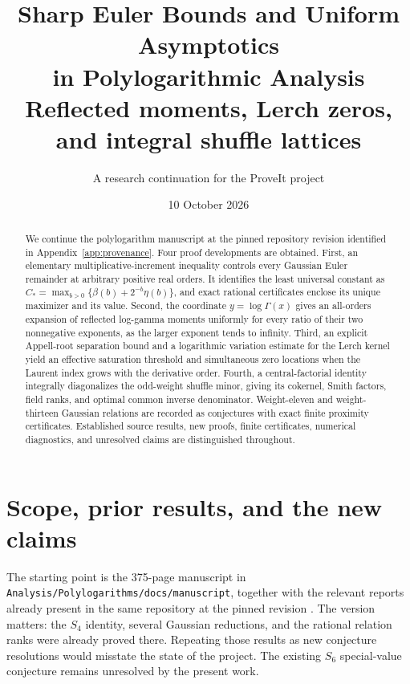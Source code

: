\documentclass[11pt,letterpaper]{article}
\title{\color{inkblue}\bfseries Sharp Euler Bounds and Uniform Asymptotics\\[3pt]
 in Polylogarithmic Analysis\\[8pt]
 \large\normalfont Reflected moments, Lerch zeros, and integral shuffle lattices}
\author{A research continuation for the ProveIt project}
\date{10 October 2026}
\theoremstyle{definition}
\theoremstyle{remark}
\newcommand{\code}[1]{\nolinkurl{#1}}
\begin{document}
\maketitle
\begin{abstract}
We continue the polylogarithm manuscript at the pinned repository revision
identified in Appendix~\ref{app:provenance}. Four proof developments are obtained. First, an elementary
multiplicative-increment inequality controls every Gaussian Euler remainder
at arbitrary positive real orders. It identifies the least universal
constant as $C_*=\max_{b>0}\{\beta(b)+2^{-b}\eta(b)\}$, and exact rational
certificates enclose its unique maximizer and its value. Second, the
coordinate $y=\log\Gamma(x)$ gives an all-orders expansion of reflected
log-gamma moments uniformly for every ratio of their two nonnegative
exponents, as the larger exponent tends to infinity. Third, an explicit
Appell-root separation bound and a logarithmic variation estimate for
the Lerch kernel yield an effective saturation threshold and simultaneous
zero locations when the Laurent index grows with the derivative order.
Fourth, a central-factorial identity integrally diagonalizes the odd-weight
shuffle minor, giving its cokernel, Smith factors, field ranks, and optimal
common inverse denominator. Weight-eleven and weight-thirteen Gaussian
relations are recorded as conjectures with exact finite proximity
certificates. Established source results, new proofs, finite certificates,
numerical diagnostics, and unresolved claims are distinguished throughout.
\end{abstract}

\tableofcontents
\clearpage

\section{Scope, prior results, and the new claims}
\label{sec:introduction}

The starting point is the 375-page manuscript in
\code{Analysis/Polylogarithms/docs/manuscript}, together with the relevant
reports already present in the same repository at the pinned revision
\cite{repo}. The version matters: the $S_4$ identity, several Gaussian
reductions, and the rational relation ranks were already proved there.
Repeating those results as new conjecture resolutions would misstate the
state of the project. The existing $S_6$ special-value conjecture remains
unresolved by the present work.
\end{document}
